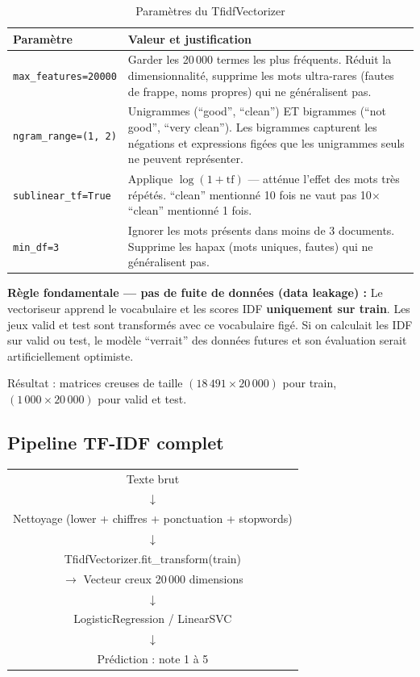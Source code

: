 \documentclass[12pt, a4paper]{article}
\begin{document}
\begin{table}[H]
  \centering
  \begin{tabular}{lp{9cm}}
    \toprule
    \textbf{Paramètre} & \textbf{Valeur et justification} \\
    \midrule
    \texttt{max\_features=20000} &
      Garder les 20\,000 termes les plus fréquents. Réduit la dimensionnalité,
      supprime les mots ultra-rares (fautes de frappe, noms propres) qui
      ne généralisent pas. \\
    \texttt{ngram\_range=(1, 2)} &
      Unigrammes (``good'', ``clean'') ET bigrammes (``not good'', ``very clean'').
      Les bigrammes capturent les négations et expressions figées que les
      unigrammes seuls ne peuvent représenter. \\
    \texttt{sublinear\_tf=True} &
      Applique $\log(1 + \text{tf})$ — atténue l'effet des mots très répétés.
      ``clean'' mentionné 10 fois ne vaut pas 10$\times$ ``clean'' mentionné 1 fois. \\
    \texttt{min\_df=3} &
      Ignorer les mots présents dans moins de 3 documents. Supprime les hapax
      (mots uniques, fautes) qui ne généralisent pas. \\
    \bottomrule
  \end{tabular}
  \caption{Paramètres du TfidfVectorizer}
\end{table}

\textbf{Règle fondamentale — pas de fuite de données (data leakage) :}
Le vectoriseur apprend le vocabulaire et les scores IDF \textbf{uniquement sur train}.
Les jeux valid et test sont transformés avec ce vocabulaire figé.
Si on calculait les IDF sur valid ou test, le modèle ``verrait'' des données futures
et son évaluation serait artificiellement optimiste.

Résultat : matrices creuses de taille $(18\,491 \times 20\,000)$ pour train,
$(1\,000 \times 20\,000)$ pour valid et test.

\subsection{Pipeline TF-IDF complet}

\begin{center}
\ttfamily\small
\begin{tabular}{c}
Texte brut \\
$\downarrow$ \\
Nettoyage (lower + chiffres + ponctuation + stopwords) \\
$\downarrow$ \\
TfidfVectorizer.fit\_transform(train) \\
$\rightarrow$ Vecteur creux 20\,000 dimensions \\
$\downarrow$ \\
LogisticRegression / LinearSVC \\
$\downarrow$ \\
Prédiction : note 1 à 5 \\
\end{tabular}
\end{center}
\end{document}
